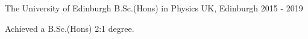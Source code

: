 



\begin{cventries}

  \cventry
    {The University of Edinburgh} %
    {B.Sc.(Hons) in Physics} %
    {UK, Edinburgh} %
    {2015 - 2019} %
    {
      \begin{cvitems} %
        \item{Achieved a B.Sc.(Hons) 2:1 degree.}
      \end{cvitems}
    }
    

\end{cventries}